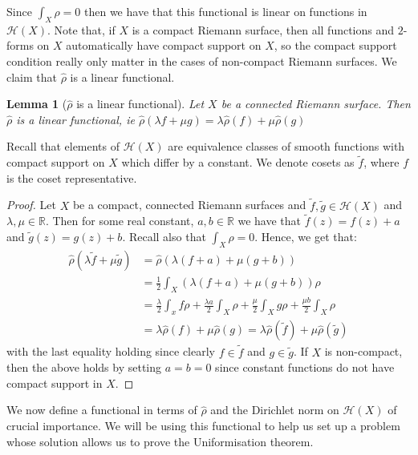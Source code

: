 \documentclass[11pt]{report}
\newtheorem{lemma}[thm]{Lemma}
\theoremstyle{definition}
\begin{document}
Since $\int_X \rho = 0$ then we have that this functional is linear on functions in $\mathcal{H}(X)$. Note that, if $X$ is a compact Riemann surface, then all functions and $2$-forms on $X$ automatically have compact support on $X$, so the compact support condition really only matter in the cases of non-compact Riemann surfaces. We claim that $\hat{\rho}$ is a linear functional.
\begin{lemma}[$\hat{\rho}$ is a linear functional]\label{rhohatlinear}
  Let $X$ be a connected Riemann surface. Then $\hat{\rho}$ is a linear functional, ie $\hat{\rho}(\lambda f+ \mu g) = \lambda \hat{\rho}(f) + \mu \hat{\rho}(g)$
\end{lemma}
Recall that elements of $\mathcal{H}(X)$ are equivalence classes of smooth functions with compact support on $X$ which differ by a constant. We denote cosets as $\tilde{f}$, where $f$ is the coset representative.
\begin{proof}
  Let $X$ be a compact, connected Riemann surfaces and $\tilde{f},\tilde{g} \in \mathcal{H}(X)$ and $\lambda,\mu \in \mathbb{R}$. Then for some real constant, $a,b \in \mathbb{R}$ we have that $\tilde{f}(z) = f(z) + a$ and $\tilde{g}(z) = g(z) + b$. Recall also that $\int_X \rho = 0$.
  Hence, we get that:
  \begin{align*}
    \hat{\rho}(\lambda \tilde{f}+ \mu \tilde{g}) &= \hat{\rho}(\lambda(f + a) + \mu(g + b)) \\
    &=\frac{1}{2}\int_X (\lambda(f + a) + \mu(g + b))\rho \\
    &=\frac{\lambda}{2} \int_x f\rho + \frac{\lambda a}{2}\int_X \rho + \frac{\mu}{2} \int_X g\rho + \frac{\mu b}{2}\int_X \rho \\
    &=\lambda \hat{\rho}(f) + \mu \hat{\rho}(g)=\lambda \hat{\rho}(\tilde{f}) + \mu \hat{\rho}(\tilde{g})
  \end{align*}
  with the last equality holding since clearly $f \in \tilde{f}$ and $g \in \tilde{g}$. If $X$ is non-compact, then the above holds by setting $a=b=0$ since constant functions do not have compact support in $X$.
\end{proof}
We now define a functional in terms of $\hat{\rho}$ and the Dirichlet norm on $\mathcal{H}(X)$ of crucial importance. We will be using this functional to help us set up a problem whose solution allows us to prove the Uniformisation theorem. 
\end{document}
